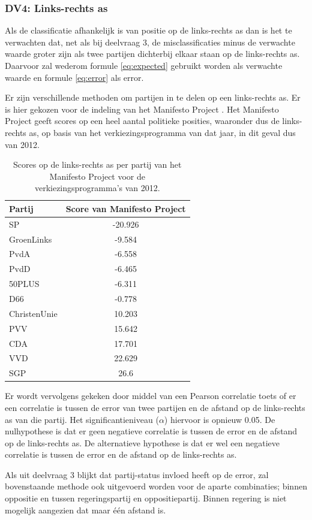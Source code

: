 \subsubsection{DV4: Links-rechts as}
Als de classificatie afhankelijk is van positie op de links-rechts as dan is het te verwachten dat, net als bij deelvraag 3, de misclassificaties minus de verwachte waarde groter zijn als twee partijen dichterbij elkaar staan op de links-rechts as. Daarvoor zal wederom formule \ref{eq:expected} gebruikt worden als verwachte waarde en formule \ref{eq:error} als error.\par
Er zijn verschillende methoden om partijen in te delen op een links-rechts as. Er is hier gekozen voor de indeling van het Manifesto Project \cite{Volkens:2017}. Het Manifesto Project geeft scores op een heel aantal politieke posities, waaronder dus de links-rechts as, op basis van het verkiezingsprogramma van dat jaar, in dit geval dus van 2012.\par
\begin{table}[H]
\centering
\caption{Scores op de links-rechts as per partij van het Manifesto Project voor de verkiezingsprogramma's van 2012.}
\label{my-label}
\centering
\begin{tabular}{lc}
\toprule
Partij  & Score van Manifesto Project \\
\midrule
SP           & -20.926 \\ 
GroenLinks   & -9.584 \\ 
PvdA         & -6.558 \\ 
PvdD         & -6.465 \\ 
50PLUS       & -6.311\\ 
D66          & -0.778\\ 
ChristenUnie & 10.203\\ 
PVV          & 15.642\\ 
CDA          & 17.701\\
VVD          & 22.629\\ 
SGP          & 26.6\\ 
\bottomrule
\end{tabular}
\end{table}
Er wordt vervolgens gekeken door middel van een Pearson correlatie toets of er een correlatie is tussen de error van twee partijen en de afstand op de links-rechts as van die partij. Het significantieniveau ($\alpha$) hiervoor is opnieuw 0.05. De nulhypothese is dat er geen negatieve correlatie is tussen de error en de afstand op de links-rechts as. De alternatieve hypothese is dat er wel een negatieve correlatie is tussen de error en de afstand op de links-rechts as.\par
Als uit deelvraag 3 blijkt dat partij-status invloed heeft op de error, zal bovenstaande methode ook uitgevoerd worden voor de aparte combinaties; binnen oppositie en tussen regeringspartij en oppositiepartij. Binnen regering is niet mogelijk aangezien dat maar één afstand is.\par

